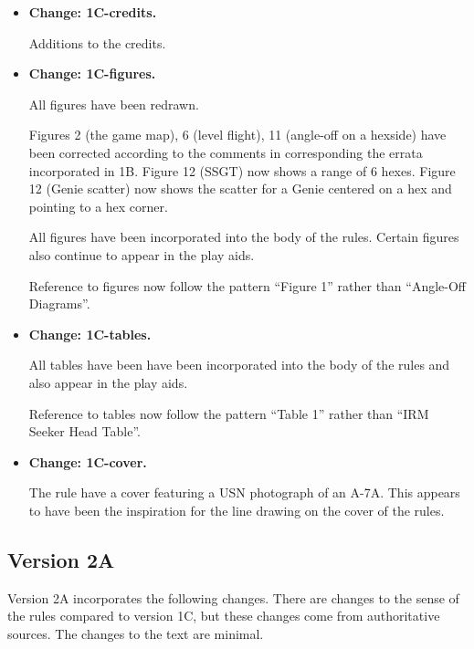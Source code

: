 \documentclass[10pt]{report}
\newcommand{\itemtag}[1]{\item \textbf{Change: #1.}\par}
\begin{document}
\begin{itemize}
    \itemtag{1C-credits} Additions to the credits.

    \itemtag{1C-figures} All figures have been redrawn. 
    
    Figures 2 (the game map), 6 (level flight), 11 (angle-off on a hexside) have been corrected according to the comments in corresponding the errata incorporated in 1B. Figure 12 (SSGT) now shows a range of 6 hexes. Figure 12 (Genie scatter) now shows the scatter for a Genie centered on a hex and pointing to a hex corner.
    
    All figures have been incorporated into the body of the rules. Certain figures also continue to appear in the play aids.
    
    Reference to figures now follow the pattern “Figure 1” rather than “Angle-Off Diagrams”.

    \itemtag{1C-tables} All tables have been have been incorporated into the body of the rules and also appear in the play aids. 
    
    Reference to tables now follow the pattern “Table 1” rather than “IRM Seeker Head Table”.

    \itemtag{1C-cover} The rule have a cover featuring a USN photograph of an A-7A. This appears to have been the inspiration for the line drawing on the cover of the {\TSOH} rules.

\end{itemize}

\subsection{Version 2A}

Version 2A incorporates the following changes. There are changes to the sense of the rules compared to version 1C, but these changes come from authoritative sources. The changes to the text are minimal.
\end{document}

